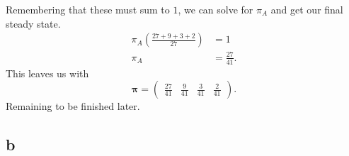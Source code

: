 \documentclass{article}
\begin{document}
Remembering that these must sum to $1$, we can solve for $\pi_A$ and get our final steady state.
\begin{align}
    \pi_A\left( \frac{27 + 9 + 3 + 2}{27} \right) &= 1 \\
    \pi_A &= \frac{27}{41}. 
\end{align}
This leaves us with
\begin{equation}
    \boldsymbol{\pi} = \begin{pmatrix}
        \frac{27}{41} & \frac{9}{41} & \frac{3}{41} & \frac{2}{41}
    \end{pmatrix}.
\end{equation}
Remaining to be finished later.

\subsection{b}
\end{document}
